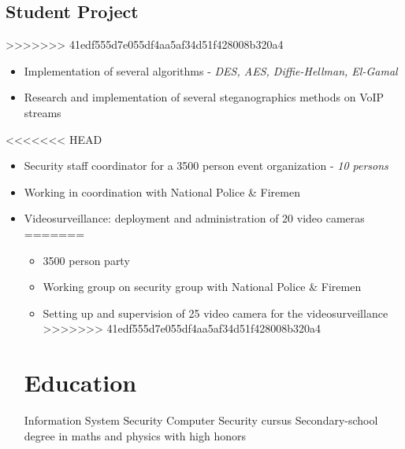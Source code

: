 \documentclass[11pt,a4paper,francais]{moderncv}
\begin{document}
\subsection{Student Project}
>>>>>>> 41edf555d7e055df4aa5af34d51f428008b320a4
{
\begin{itemize}
 \item Implementation of several algorithms - \textit{DES, AES, Diffie-Hellman, El-Gamal}
 \item Research and implementation of several steganographics methods on VoIP streams
\end{itemize}
}
<<<<<<< HEAD
{
\begin{itemize}
  \item Security staff coordinator for a 3500 person event organization - \textit{10 persons}
  \item Working in coordination with National Police \& Firemen 
  \item Videosurveillance: deployment and administration of 20 video cameras
=======
{
\begin{itemize}
  \item 3500 person party
  \item Working group on security group with National Police \& Firemen 
  \item Setting up and supervision of 25 video camera for the videosurveillance
>>>>>>> 41edf555d7e055df4aa5af34d51f428008b320a4
\end{itemize}
}


\section{Education}
{Information System Security}
{Computer Security cursus}
{Secondary-school degree in maths and physics with high honors}




\end{itemize}}
\end{document}
